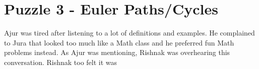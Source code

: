 \chapter{Puzzle 3 - Euler Paths/Cycles}

Ajur was tired after listening to a lot of definitions and examples. He complained to Jura that looked too much like a Math class and he preferred fun Math problems instead. As Ajur was mentioning, Rishnak was overhearing this conversation. Rishnak too felt it was 